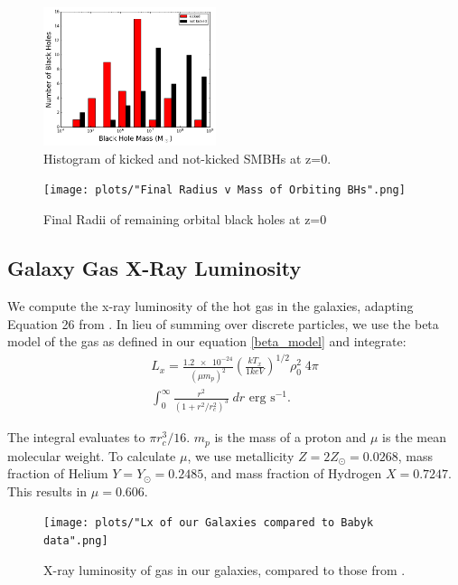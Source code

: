 \documentclass[english, apj]{emulateapj}
\begin{document}
\begin{figure}[ht]
\begin{center}
\includegraphics[width=0.45\textwidth]{plots/kicked_stats.png}
\caption{Histogram of kicked and not-kicked SMBHs at z=0.}
\label{fig:kicked_stats}
\end{center}
\end{figure}

\begin{figure}[htbp]
\begin{center}
\texttt{[image: plots/"Final Radius v Mass of Orbiting BHs".png]}
\caption{Final Radii of remaining orbital black holes at z=0}
\label{fig:mvr}
\end{center}
\end{figure}

\subsection{Galaxy Gas X-Ray Luminosity}
We compute the x-ray luminosity of the hot gas in the galaxies, adapting Equation 26 from \citet{2012ApJ...754..125C}. In lieu of summing over discrete particles, we use the beta model of the gas as defined in our equation \ref{beta_model} and integrate:
\begin{equation}
\begin{aligned}
    L_x ={} \frac{\num{1.2e-24}}{(\mu m_p)^2}\left(\frac{kT_x}{1keV}\right)^{1/2}\rho_0^{2}\;4{\pi} \\
    \int_{0}^{\infty}\frac{r^2}{(1+r^2/r_c^2)^{3}}\;dr\text{  erg s}^{-1}.
\end{aligned}
\end{equation}

The integral evaluates to ${\pi}r_c^3/16$.  $m_p$ is the mass of a proton and $\mu$ is the mean molecular weight.  To calculate $\mu$, we use metallicity $Z=2Z_{\odot}=0.0268$, mass fraction of Helium $Y=Y_{\odot}=0.2485$, and mass fraction of Hydrogen $X=0.7247$.  This results in $\mu=0.606$.

\begin{figure}[htbp]
\begin{center}
\texttt{[image: plots/"Lx of our Galaxies compared to Babyk data".png]}
\caption{X-ray luminosity of gas in our galaxies, compared to those from \citet{2018ApJ...857...32B}.}
\label{fig:galgas1}
\end{center}
\end{figure}
\end{document}

